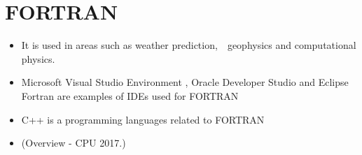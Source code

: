 \documentclass{article}
\begin{document}
	\section{FORTRAN}
	\begin{itemize}
		\item It is used in areas such as weather prediction,  geophysics and computational physics.
		\item 	Microsoft Visual Studio Environment , Oracle Developer Studio and Eclipse Fortran are examples of IDEs  used for FORTRAN
		\item C++ is a programming languages related to FORTRAN 
		\item (Overview - CPU 2017.)
	\end{itemize}
\end{document}
